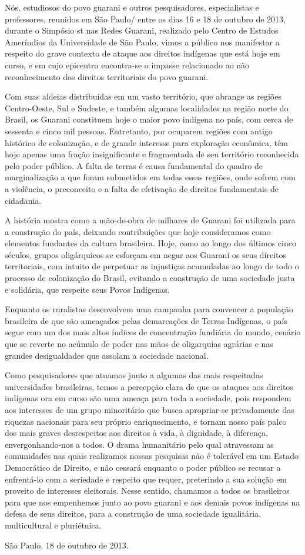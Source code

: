 Nós, estudiosos do povo guarani e outros pesquisadores, especialistas e
professores, reunidos em São Paulo/ entre os dias 16 e 18 de outubro
de 2013, durante o Simpósio st nas Redes Guarani, realizado pelo
Centro de Estudos Ameríndios da Universidade de São Paulo, vimos a
público nos manifestar a respeito do grave contexto de ataque aos
direitos indígenas que está hoje em curso, e em cujo epicentro
encontra-se o impasse relacionado ao não reconhecimento dos direitos
territoriais do povo guarani.

Com suas aldeias distribuídas em um vasto território, que abrange as
regiões Centro-Oeste, Sul e Sudeste, e também algumas localidades na
região norte do Brasil, os Guarani constituem hoje o maior povo
indígena no país, com cerca de sessenta e cinco mil pessoas.
Entretanto, por ocuparem regiões com antigo histórico de colonização, e
de grande interesse para exploração econômica, têm hoje apenas uma
fração insignificante e fragmentada de seu território reconhecida pelo
poder público. A falta de terras é causa fundamental do quadro de
marginalização a que foram submetidos em todas essas regiões, onde
sofrem com a violência, o preconceito e a falta de efetivação de
direitos fundamentais de cidadania. 

A história mostra como a mão-de-obra de milhares de Guarani foi
utilizada para a construção do país, deixando contribuições que hoje
consideramos como elementos fundantes da cultura brasileira. Hoje, como
ao longo dos últimos cinco séculos, grupos oligárquicos se esforçam em
negar aos Guarani os seus direitos territoriais, com intuito de
perpetuar as injustiças acumuladas ao longo de todo o processo de
colonização do Brasil, evitando a construção de uma sociedade justa e
solidária, que respeite seus Povos Indígenas.

Enquanto os ruralistas desenvolvem uma campanha para convencer a
população brasileira de que são ameaçados pelas demarcações de Terras
Indígenas, o país segue com um dos mais altos índices de concentração
fundiária do mundo, cenário que se reverte no acúmulo de poder nas mãos
de oligarquias agrárias e nas grandes desigualdades que assolam a
sociedade nacional. 

Como pesquisadores que atuamos junto a algumas das mais respeitadas
universidades brasileiras, temos a percepção clara de que os ataques
aos direitos indígenas ora em curso são uma ameaça para toda a
sociedade, pois respondem aos interesses de um grupo minoritário que
busca apropriar-se privadamente das riquezas nacionais para seu próprio
enriquecimento, e tornam nosso país palco dos mais graves desrespeitos
aos direitos à vida, à dignidade, à diferença, envergonhando-nos a
todos. O drama humanitário pelo qual atravessam as comunidades nas
quais realizamos nossas pesquisas não é tolerável em um Estado
Democrático de Direito, e não cessará enquanto o poder público se
recusar a enfrentá-lo com a seriedade e respeito que requer, preterindo
a sua solução em proveito de interesses eleitorais. Nesse sentido,
chamamos a todos os brasileiros para que nos empenhemos junto ao povo
guarani e aos demais povos indígenas na defesa de seus direitos, para a
construção de uma sociedade igualitária, multicultural e pluriétnica.

São Paulo, 18 de outubro de 2013.

